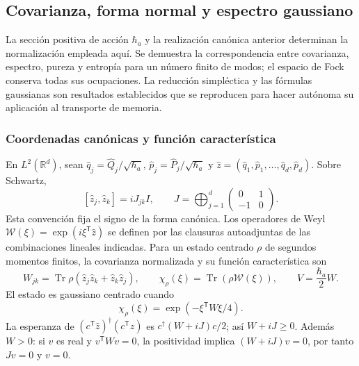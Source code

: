 \subsection{Covarianza, forma normal y espectro gaussiano}
\label{md:antmem:gauss:gaussianas-espectro}

La sección positiva de acción \(\hbar_a\) y la realización canónica
anterior determinan la normalización empleada aquí. Se demuestra la
correspondencia entre covarianza, espectro, pureza y entropía para un
número finito de modos; el espacio de Fock conserva todas sus ocupaciones.
La reducción simpléctica y las fórmulas gaussianas son resultados
establecidos que se reproducen para hacer autónoma su aplicación al
transporte de memoria.

\subsubsection{Coordenadas canónicas y función característica}
En \(L^2(\mathbb R^d)\), sean \(\widehat q_j=\widehat Q_j/\sqrt{\hbar_a}\),
\(\widehat p_j=\widehat P_j/\sqrt{\hbar_a}\) y
\(\widehat z=(\widehat q_1,\widehat p_1,\ldots,\widehat q_d,\widehat p_d)\).
Sobre Schwartz,
\[
 [\widehat z_j,\widehat z_k]=iJ_{jk}I,\qquad
 J=\bigoplus_{j=1}^d\begin{pmatrix}0&1\\-1&0\end{pmatrix}.
\]
Esta convención fija el signo de la forma canónica. Los operadores de
Weyl \(\mathcal W(\xi)=\exp(i\xi^{\mathsf T}\widehat z)\) se definen
por las clausuras autoadjuntas de las combinaciones lineales indicadas.
Para un estado centrado \(\rho\) de segundos momentos finitos, la
covarianza normalizada y su función característica son
\[
 W_{jk}=\operatorname{Tr}\rho(\widehat z_j\widehat z_k+\widehat z_k\widehat z_j),
 \qquad \chi_\rho(\xi)=\operatorname{Tr}(\rho\mathcal W(\xi)),\qquad
 V=\frac{\hbar_a}{2}W.
\]
El estado es gaussiano centrado cuando
\begin{equation}
 \chi_\rho(\xi)=\exp(-\xi^{\mathsf T}W\xi/4).
 \label{md:antmem:gauss:eq:caracteristica-gaussiana}
\end{equation}
La esperanza de \((c^{\mathsf T}\widehat z)^\dagger
(c^{\mathsf T}\widehat z)\) es \(c^\dagger(W+iJ)c/2\); así
\(W+iJ\geq0\). Además \(W>0\): si \(v\) es real y
\(v^{\mathsf T}Wv=0\), la positividad implica \((W+iJ)v=0\),
por tanto \(Jv=0\) y \(v=0\).

